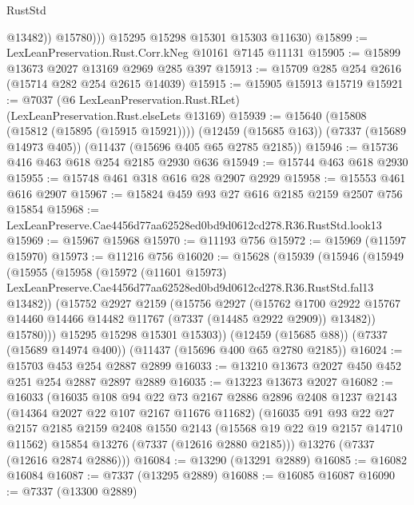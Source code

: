 \begin{lexlean}{RustStd}
\begin{coremodule}
                @13482))
            @15780)))
      @15295
      @15298
      @15301
      @15303
      @11630)
@15899 := LexLeanPreservation.Rust.Corr.kNeg @10161 @7145 @11131
@15905 := @15899 @13673 @2027 @13169 @2969 @285 @397
@15913 := @15709 @285 @254 @2616 (@15714 @282 @254 @2615 @14039)
@15915 := @15905 @15913 @15719
@15921 := @7037 (@6 LexLeanPreservation.Rust.RLet) (LexLeanPreservation.Rust.elseLets @13169)
@15939 := @15640
    (@15808 (@15812 (@15895 (@15915 @15921))))
    (@12459 (@15685 @163))
    (@7337 (@15689 @14973 @405))
    (@11437 (@15696 @405 @65 @2785 @2185))
@15946 := @15736 @416 @463 @618 @254 @2185 @2930 @636
@15949 := @15744 @463 @618 @2930
@15955 := @15748 @461 @318 @616 @28 @2907 @2929
@15958 := @15553 @461 @616 @2907
@15967 := @15824 @459 @93 @27 @616 @2185 @2159 @2507 @756 @15854
@15968 := LexLeanPreserve.Cae4456d77aa62528ed0bd9d0612cd278.R36.RustStd.look13
@15969 := @15967 @15968
@15970 := @11193 @756
@15972 := @15969 (@11597 @15970)
@15973 := @11216 @756
@16020 := @15628
    (@15939
      (@15946
        (@15949
          (@15955
            (@15958
              (@15972
                (@11601 @15973)
                LexLeanPreserve.Cae4456d77aa62528ed0bd9d0612cd278.R36.RustStd.fal13
                @13482))
            (@15752
              @2927
              @2159
              (@15756
                @2927
                (@15762
                  @1700
                  @2922
                  @15767
                  @14460
                  @14466
                  @14482
                  @11767
                  (@7337 (@14485 @2922 @2909))
                  @13482))
              @15780)))
        @15295
        @15298
        @15301
        @15303))
    (@12459 (@15685 @88))
    (@7337 (@15689 @14974 @400))
    (@11437 (@15696 @400 @65 @2780 @2185))
@16024 := @15703 @453 @254 @2887 @2899
@16033 := @13210 @13673 @2027 @450 @452 @251 @254 @2887 @2897 @2889
@16035 := @13223 @13673 @2027
@16082 := @16033
    (@16035
      @108
      @94
      @22
      @73
      @2167
      @2886
      @2896
      @2408
      @1237
      @2143
      (@14364 @2027 @22 @107 @2167 @11676 @11682)
      (@16035
        @91
        @93
        @22
        @27
        @2157
        @2185
        @2159
        @2408
        @1550
        @2143
        (@15568 @19 @22 @19 @2157 @14710 @11562)
        @15854
        @13276
        (@7337 (@12616 @2880 @2185)))
      @13276
      (@7337 (@12616 @2874 @2886)))
@16084 := @13290 (@13291 @2889)
@16085 := @16082 @16084
@16087 := @7337 (@13295 @2889)
@16088 := @16085 @16087
@16090 := @7337 (@13300 @2889)

\end{coremodule}
\end{lexlean}
